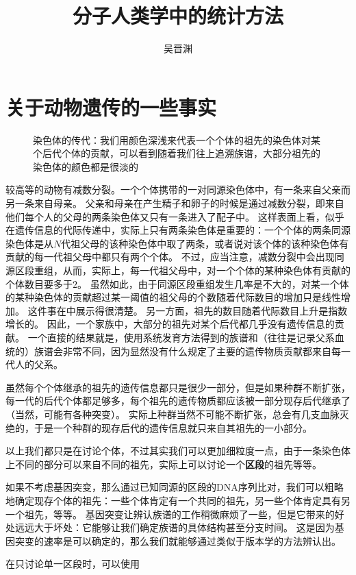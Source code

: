\documentclass[hyperref, UTF8, a4paper, oneside]{ctexart}
\title{分子人类学中的统计方法}
\author{吴晋渊}
\renewcommand{\emph}[1]{\textbf{#1}}
\numberwithin{equation}{section}
\begin{document}
\maketitle

\section{关于动物遗传的一些事实}

\begin{figure}
    \centering
    
    \caption{染色体的传代：我们用颜色深浅来代表一个个体的祖先的染色体对某个后代个体的贡献，可以看到随着我们往上追溯族谱，大部分祖先的染色体的颜色都是很淡的}
    \label{fig:generation-passing}
\end{figure}

较高等的动物有减数分裂。一个个体携带的一对同源染色体中，有一条来自父亲而另一条来自母亲。
父亲和母亲在产生精子和卵子的时候是通过减数分裂，即来自他们每个人的父母的两条染色体又只有一条进入了配子中。
这样表面上看，似乎在遗传信息的代际传递中，实际上只有两条染色体是重要的：一个个体的两条同源染色体是从$N$代祖父母的该种染色体中取了两条，或者说对该个体的该种染色体有贡献的每一代祖父母中都只有两个个体。
不过，应当注意，减数分裂中会出现同源区段重组，从而，实际上，每一代祖父母中，对一个个体的某种染色体有贡献的个体数目要多于$2$。
虽然如此，由于同源区段重组发生几率是不大的，对某一个体的某种染色体的贡献超过某一阈值的祖父母的个数随着代际数目的增加只是线性增加。
这件事在中展示得很清楚。
另一方面，祖先的数目随着代际数目上升是指数增长的。
因此，一个家族中，大部分的祖先对某个后代都几乎没有遗传信息的贡献。
一个直接的结果就是，使用系统发育方法得到的族谱和（往往是记录父系血统的）族谱会非常不同，因为显然没有什么规定了主要的遗传物质贡献都来自每一代人的父系。

虽然每个个体继承的祖先的遗传信息都只是很少一部分，但是如果种群不断扩张，每一代的后代个体都足够多，每个祖先的遗传物质都应该被一部分现存后代继承了（当然，可能有各种突变）。
实际上种群当然不可能不断扩张，总会有几支血脉灭绝的，于是一个种群的现存后代的遗传信息就只来自其祖先的一小部分。

以上我们都只是在讨论个体，不过其实我们可以更加细粒度一点，由于一条染色体上不同的部分可以来自不同的祖先，实际上可以讨论一个\emph{区段}的祖先等等。

如果不考虑基因突变，那么通过已知同源的区段的DNA序列比对，我们可以粗略地确定现存个体的祖先：一些个体肯定有一个共同的祖先，另一些个体肯定具有另一个祖先，等等。
基因突变让辨认族谱的工作稍微麻烦了一些，但是它带来的好处远远大于坏处：它能够让我们确定族谱的具体结构甚至分支时间。
这是因为基因突变的速率是可以确定的，那么我们就能够通过类似于版本学的方法辨认出。

在只讨论单一区段时，可以使用
\end{document}
